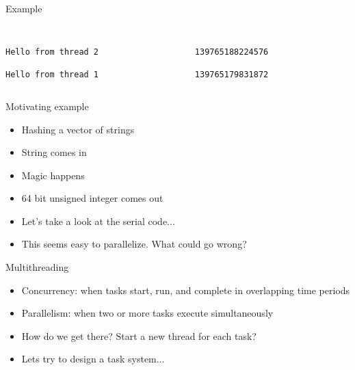 \documentclass{beamer}
\begin{document}
\begin{frame}{Example}
\tiny
\begin{columns}
\begin{column}{0.5\textwidth}
\inputminted{cpp}{../code/examples/example01a.cpp}

\vspace{.25cm}
\hrulefill

\texttt{Hello from thread 2}

\texttt{Hello from thread 1}
\end{column}
\begin{column}{0.5\textwidth}
\inputminted{cpp}{../code/examples/example01b.cpp}

\vspace{.25cm}
\hrulefill

\texttt{139765188224576}

\texttt{139765179831872}
\end{column}
\end{columns}
\end{frame}

\begin{frame}{Motivating example}
\begin{itemize}
\item Hashing a vector of strings
\item String comes in
\item Magic happens
\item 64 bit unsigned integer comes out
\item Let's take a look at the serial code...
\item This seems easy to parallelize. What could go wrong?
\end{itemize}
\end{frame}

\begin{frame}{Multithreading}
\begin{itemize}
\item Concurrency: when tasks start, run, and complete in overlapping time periods
\item Parallelism: when two or more tasks execute simultaneously
\item How do we get there? Start a new thread for each task?
\item Lets try to design a task system...
\end{itemize}
\end{frame}
\end{document}

